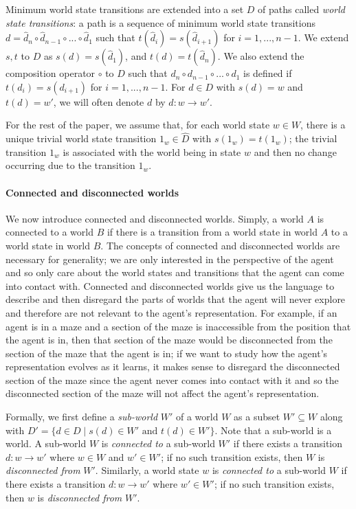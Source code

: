 Minimum world state transitions are extended into a set $D$ of paths called \textit{world state transitions}: a path is a sequence of minimum world state transitions $d = \hat{d}_{n} \circ \hat{d}_{n-1} \circ ... \circ \hat{d}_{1}$ such that $t(\hat{d}_{i}) = s(\hat{d}_{i+1})$ for $i = 1, ..., n-1$.
We extend $s, t$ to $D$ as $s(d) = s(\hat{d}_{1})$, and $t(d) = t(\hat{d}_{n})$.
We also extend the composition operator $\circ$ to $D$ such that $d_{n} \circ d_{n-1} \circ ... \circ d_{1}$ is defined if $t({d}_{i}) = s({d}_{i+1})$ for $i = 1, ..., n-1$.
For $d \in D$ with $s(d) = w$ and $t(d) = w'$, we will often denote $d$ by $d: w \to w'$.

For the rest of the paper, we assume that, for each world state $w \in W$, there is a unique trivial world state transition $1_{w} \in \hat{D}$ with $s(1_{w}) = t(1_{w})$; the trivial transition $1_{w}$ is associated with the world being in state $w$ and then no change occurring due to the transition $1_{w}$.

\paragraph{Connected and disconnected worlds}
We now introduce connected and disconnected worlds.
Simply, a world $A$ is connected to a world $B$ if there is a transition from a world state in world $A$ to a world state in world $B$.
The concepts of connected and disconnected worlds are necessary for generality; we are only interested in the perspective of the agent and so only care about the world states and transitions that the agent can come into contact with.
Connected and disconnected worlds give us the language to describe and then disregard the parts of worlds that the agent will never explore and therefore are not relevant to the agent's representation.
For example, if an agent is in a maze and a section of the maze is inaccessible from the position that the agent is in, then that section of the maze would be disconnected from the section of the maze that the agent is in; if we want to study how the agent's representation evolves as it learns, it makes sense to disregard the disconnected section of the maze since the agent never comes into contact with it and so the disconnected section of the maze will not affect the agent's representation.

Formally, we first define a \textit{sub-world} $W'$ of a world $W$ as a subset $W' \subseteq W$ along with $D' = \{d \in D \mid s(d) \in W'\text{ and }t(d) \in W'\}$.
Note that a sub-world is a world.
A sub-world $W$ is \textit{connected to} a sub-world $W'$ if there exists a transition $d: w \to w'$ where $w \in W$ and $w' \in W'$; if no such transition exists, then $W$ is \textit{disconnected from} $W'$.
Similarly, a world state $w$ is \textit{connected to} a sub-world $W$ if there exists a transition $d: w \to w'$ where $w' \in W'$; if no such transition exists, then $w$ is \textit{disconnected from} $W'$.


